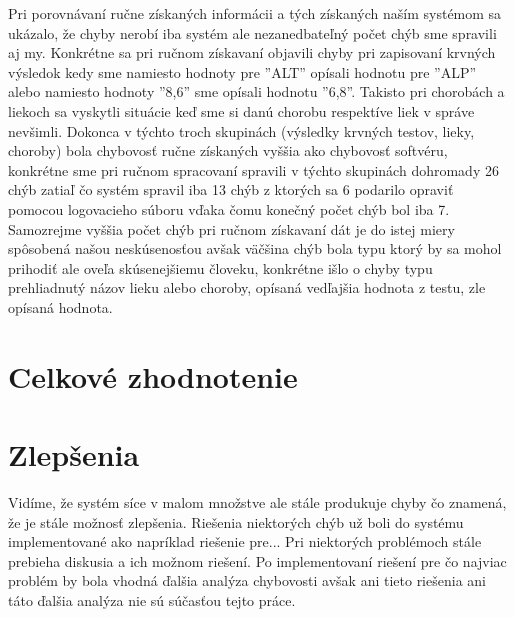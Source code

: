 Pri porovnávaní ručne získaných informácii a tých získaných naším systémom sa ukázalo, že chyby nerobí iba systém ale nezanedbateľný počet chýb sme spravili aj my. Konkrétne sa pri ručnom získavaní objavili chyby pri zapisovaní krvných výsledok kedy sme namiesto hodnoty pre ''ALT'' opísali hodnotu pre ''ALP'' alebo namiesto hodnoty ''8,6'' sme opísali hodnotu ''6,8''. Takisto pri chorobách a liekoch sa vyskytli situácie keď sme si danú chorobu respektíve liek v správe nevšimli. Dokonca v týchto troch skupinách (výsledky krvných testov, lieky, choroby) bola chybovosť ručne získaných vyššia ako chybovosť softvéru, konkrétne sme pri ručnom spracovaní spravili v týchto skupinách dohromady 26 chýb zatiaľ čo systém spravil iba 13 chýb z ktorých sa 6 podarilo opraviť pomocou logovacieho súboru vďaka čomu konečný počet chýb bol iba 7. Samozrejme vyššia počet chýb pri ručnom získavaní dát je do istej miery spôsobená našou neskúsenosťou avšak väčšina chýb bola typu ktorý by sa mohol prihodiť ale oveľa skúsenejšiemu človeku, konkrétne išlo o chyby typu prehliadnutý názov lieku alebo choroby, opísaná vedľajšia hodnota z testu, zle opísaná hodnota.   

\section{Celkové zhodnotenie}


\section{Zlepšenia}

Vidíme, že systém síce v malom množstve ale stále produkuje chyby čo znamená, že je stále možnosť zlepšenia. Riešenia niektorých chýb už boli do systému implementované ako napríklad riešenie pre... Pri niektorých problémoch stále prebieha diskusia a ich možnom riešení. Po implementovaní riešení pre čo najviac problém by bola vhodná ďalšia analýza chybovosti avšak ani tieto riešenia ani táto ďalšia analýza nie sú súčasťou tejto práce.
